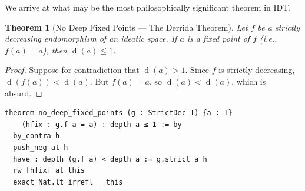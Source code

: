 \documentclass[11pt,openany]{book}
\theoremstyle{definition}
\theoremstyle{plain}
\newtheorem{theorem}[axiom]{Theorem}
\theoremstyle{remark}
\newcommand{\depth}{\operatorname{d}}       %
\begin{document}
We arrive at what may be the most philosophically significant theorem in IDT.

\begin{theorem}[No Deep Fixed Points --- The Derrida Theorem]
\label{thm:no-deep-fixed}
Let $f$ be a strictly decreasing endomorphism of an ideatic space. If $a$ is a fixed point of $f$ (i.e., $f(a) = a$), then $\depth(a) \leq 1$.
\end{theorem}

\begin{proof}
Suppose for contradiction that $\depth(a) > 1$. Since $f$ is strictly decreasing, $\depth(f(a)) < \depth(a)$. But $f(a) = a$, so $\depth(a) < \depth(a)$, which is absurd.
\end{proof}

\begin{lstlisting}[language=Lean4]
theorem no_deep_fixed_points (g : StrictDec I) {a : I}
    (hfix : g.f a = a) : depth a ≤ 1 := by
  by_contra h
  push_neg at h
  have : depth (g.f a) < depth a := g.strict a h
  rw [hfix] at this
  exact Nat.lt_irrefl _ this
\end{lstlisting}
\end{document}
